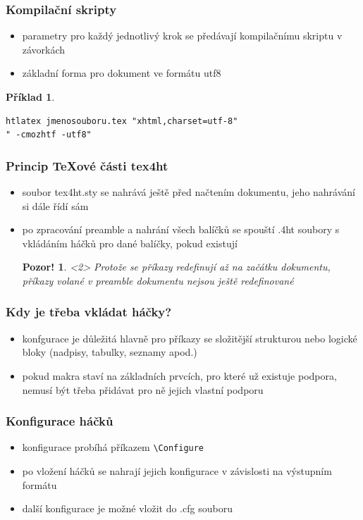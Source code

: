 \documentclass[czech]{beamer}
\newtheorem{priklad}{Příklad}
\newtheorem{pozor}{Pozor!}
\begin{document}
\begin{frame}[fragile]
  \frametitle{Kompilační skripty}
  \begin{itemize}
    \item parametry pro každý jednotlivý krok se předávají kompilačnímu skriptu v závorkách
    \item základní forma pro dokument ve formátu utf8
  \end{itemize}
      \begin{priklad}
        \small 
\begin{verbatim}
htlatex jmenosouboru.tex "xhtml,charset=utf-8" 
" -cmozhtf -utf8"
\end{verbatim}
     \end{priklad}
\end{frame}
\begin{frame}
  \frametitle{Princip TeXové části tex4ht}
  \begin{itemize}
    \item soubor tex4ht.sty se nahrává ještě před načtením dokumentu, jeho
      nahrávání si dále řídí sám
  \item po zpracování preamble a nahrání všech balíčků se spouští .4ht soubory
    s vkládáním háčků pro dané balíčky, pokud existují
    \begin{pozor}<2>
      Protože se příkazy redefinují až na začátku dokumentu, příkazy
      volané v preamble dokumentu nejsou ještě redefinované
    \end{pozor}
\end{itemize}
\end{frame}
\begin{frame}
  \frametitle{Kdy je třeba vkládat háčky?}
  \begin{itemize}
\item konfgurace je důležitá hlavně pro příkazy se složitější strukturou nebo
      logické bloky (nadpisy, tabulky, seznamy apod.)
    \item  pokud makra staví na základních prvcích, pro které už existuje
      podpora, nemusí být třeba přidávat pro ně jejich vlastní podporu
  \end{itemize}
\end{frame}
\begin{frame}
  \frametitle{Konfigurace háčků}
  \begin{itemize}
    \item konfigurace probíhá příkazem \texttt{\textbackslash Configure}

    \item po vložení háčků se nahrají jejich konfigurace v závislosti na
      výstupním formátu
  \item další konfigurace je možné vložit do .cfg souboru
\end{itemize}
\end{frame}
\end{document}
